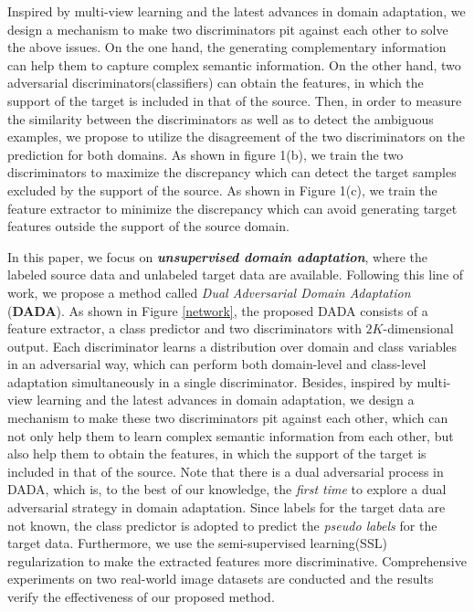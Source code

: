 \documentclass{ecai}
\begin{document}
Inspired by multi-view learning and the latest advances in domain adaptation\cite{b19,b24,b31}, we design a mechanism to make two discriminators pit against each other to solve the above issues. On the one hand, the generating complementary information can help them to capture complex semantic information. On the other hand, two adversarial discriminators(classifiers) can obtain the features, in which the support of the target is included in that of the source. Then, in order to measure the similarity between the discriminators as well as to detect the ambiguous examples, we propose to utilize the disagreement of the two discriminators on the prediction for both domains. As shown in figure 1(b), we train the two discriminators to maximize the discrepancy which can detect the target samples excluded by the support of the source.  As shown in Figure 1(c),  we train the feature extractor to minimize the discrepancy which can avoid generating target features outside the support of the source domain.

In this paper,  we focus on \textbf{{\emph{unsupervised domain adaptation}}}, where the labeled source data and unlabeled target data are available. Following this line of work, we propose a method called {{\emph{Dual Adversarial Domain Adaptation}}} (\textbf{DADA}).  As shown in Figure \ref{network}, the proposed DADA consists of a feature extractor, a class predictor and two discriminators with $2K$-dimensional output. Each discriminator learns a distribution over domain and class variables in an adversarial way, which can perform both domain-level and class-level adaptation simultaneously in a single discriminator. Besides, inspired by multi-view learning and the latest advances in domain adaptation\cite{b19,b24,b31}, we design a mechanism to make these two discriminators pit against each other, which can not only help them to learn complex semantic information from each other, but also help them to obtain the features, in which the support of the target is included in that of the source.
Note that there is a dual adversarial process in DADA, which is, to the best of our knowledge, the {\emph{first time}} to explore a dual adversarial strategy in domain adaptation. Since labels for the target data are not known, the class predictor is adopted to predict the {\emph{pseudo labels}} for the target data. Furthermore, we use the semi-supervised learning(SSL) regularization to make the extracted features more discriminative. Comprehensive experiments on two real-world image datasets are conducted and the results verify the effectiveness of our proposed method.
\end{document}
